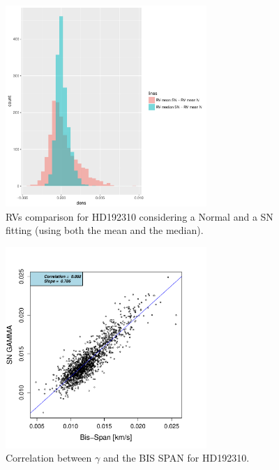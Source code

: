 \documentclass[11pt, oneside]{article}
\begin{document}
{%
\iffalse
%
\begin{figure}[htbp]
   \centering
\includegraphics[height = 3in]{[0]HD19231_HistogramsDiff.pdf} 
   \caption{RVs comparison for HD192310 considering a Normal and a SN fitting (using both the mean and the median).}
   \label{fig:HD192310:RV}
\end{figure}
%
\begin{figure}[htbp]
   \centering
\includegraphics[height = 3in]{HD19231_[2]gamma_vs_bisspan.pdf} 
   \caption{Correlation between $\gamma$ and the BIS SPAN for HD192310.}
   \label{fig:Gliese785:corr.gamma}
\end{figure}
%


}
\end{document}
